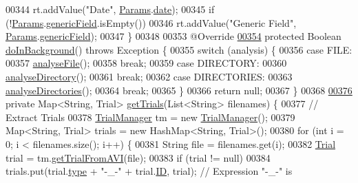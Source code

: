 \begin{DoxyCode}
{{{{{{{{00344       rt.addValue(\textcolor{stringliteral}{"Date"}, \hyperlink{classdata_1_1_params}{Params}.\hyperlink{classdata_1_1_params_aecbab8174a6d72649883508cf9940d58}{date});
00345     \textcolor{keywordflow}{if} (!\hyperlink{classdata_1_1_params}{Params}.\hyperlink{classdata_1_1_params_a253e4e926c0399ed1ae42b5a5989824d}{genericField}.isEmpty())
00346       rt.addValue(\textcolor{stringliteral}{"Generic Field"}, \hyperlink{classdata_1_1_params}{Params}.\hyperlink{classdata_1_1_params_a253e4e926c0399ed1ae42b5a5989824d}{genericField});
00347   \}
00348 
00353   @Override
\hypertarget{_motility_8java_source_l00354}{}\hyperlink{classanalysis_1_1_motility_ab048bf7b5ce8c46bb48b99b8d0999110}{00354}   \textcolor{keyword}{protected} Boolean \hyperlink{classanalysis_1_1_motility_ab048bf7b5ce8c46bb48b99b8d0999110}{doInBackground}() throws Exception \{
00355     \textcolor{keywordflow}{switch} (analysis) \{
00356       \textcolor{keywordflow}{case} FILE:
00357         \hyperlink{classanalysis_1_1_motility_a0b1464e818c4300782cb7e3322448f95}{analyseFile}();
00358         \textcolor{keywordflow}{break};
00359       \textcolor{keywordflow}{case} DIRECTORY:
00360         \hyperlink{classanalysis_1_1_motility_ad8447fb7554f7f126822c7a3f3f680ce}{analyseDirectory}();
00361         \textcolor{keywordflow}{break};
00362       \textcolor{keywordflow}{case} DIRECTORIES:
00363         \hyperlink{classanalysis_1_1_motility_ab3d086d15d667db78ea6785d8fc90223}{analyseDirectories}();
00364         \textcolor{keywordflow}{break};
00365     \}
00366     \textcolor{keywordflow}{return} null;
00367   \}
00368 
\hypertarget{_motility_8java_source_l00376}{}\hyperlink{classanalysis_1_1_motility_a5580224f7f7e9df7d925ad14f9364d98}{00376}   \textcolor{keyword}{private} Map<String, Trial> \hyperlink{classanalysis_1_1_motility_a5580224f7f7e9df7d925ad14f9364d98}{getTrials}(List<String> filenames) \{
00377     \textcolor{comment}{// Extract Trials}
00378     \hyperlink{classfunctions_1_1_trial_manager}{TrialManager} tm = \textcolor{keyword}{new} \hyperlink{classfunctions_1_1_trial_manager}{TrialManager}();
00379     Map<String, Trial> trials = \textcolor{keyword}{new} HashMap<String, Trial>();
00380     \textcolor{keywordflow}{for} (\textcolor{keywordtype}{int} i = 0; i < filenames.size(); i++) \{
00381       String file = filenames.get(i);
00382       \hyperlink{classdata_1_1_trial}{Trial} trial = tm.\hyperlink{classfunctions_1_1_trial_manager_a5d815ce30de28983d08c22c909562e11}{getTrialFromAVI}(file);
00383       \textcolor{keywordflow}{if} (trial != null)
00384         trials.put(trial.\hyperlink{classdata_1_1_trial_a0b86e44425dbe3c9d866aa273f87828a}{type} + \textcolor{stringliteral}{"-\_-"} + trial.\hyperlink{classdata_1_1_trial_a317298c3409575f71e43acd3f73ce295}{ID}, trial); \textcolor{comment}{// Expression "-\_-" is}
}}}}}}}}
\end{DoxyCode}
